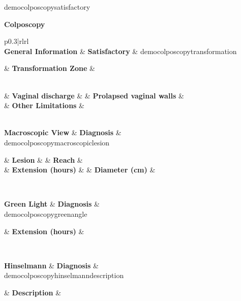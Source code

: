 \documentclass[6pt,letterpaper,spanish]{article}
\newcommand{\checkfor}[2]{%
  \ifcsname#1\endcsname%
    #2
  \else%
  \fi%
}
\begin{document}
\checkfor{democolposcopysatisfactory}{%
\begin{minipage}{\textwidth}
\noindent\makebox[\linewidth]{\rule{\textwidth}{0.1pt}}
\begin{center}
\begin{Large}
\textbf{Colposcopy}
\end{Large}
\end{center}
\vspace*{-0.5cm}
\noindent\makebox[\linewidth]{\rule{\textwidth}{0.1pt}}

\begin{tabular}{p{0.3\textwidth}|rlrl}
	\\
	\textbf{General Information}
	& \textbf{Satisfactory} & \democolposcopysatisfactory
	\checkfor{democolposcopytransformation}{
	& \textbf{Transformation Zone} & \democolposcopytransformation
	}\\
	& \textbf{Vaginal discharge} & \democolposcopylimitationsvaginaldischarge
	& \textbf{Prolapsed vaginal walls} & \democolposcopylimitationsvaginalwalls\\
	& \textbf{Other Limitations} & \multicolumn{3}{l}{\democolposcopylimitationsother}\\
	\\
	\checkfor{democolposcopymacroscopicdiagnosis}{
	\textbf{Macroscopic View}
	& \textbf{Diagnosis} & \multicolumn{3}{l}{\democolposcopymacroscopicdiagnosis}\\
	\checkfor{democolposcopymacroscopiclesion}{
		& \textbf{Lesion} & \democolposcopymacroscopiclesion
		& \textbf{Reach} & \democolposcopymacroscopicregion\\
		& \textbf{Extension (hours)} & \democolposcopymacroscopicangle
		& \textbf{Diameter (cm)} & \democolposcopymacroscopicdiameter\\
	}
	}
	\\
	\checkfor{democolposcopygreendiagnosis}{
	\textbf{Green Light}
	& \textbf{Diagnosis} & \multicolumn{3}{l}{\democolposcopygreendiagnosis}\\
		\checkfor{democolposcopygreenangle}{
			& \textbf{Extension (hours)} & \democolposcopygreenangle\\
		}
	}
	\\
	\checkfor{democolposcopyhinselmanndiagnosis}{
	\textbf{Hinselmann}
	& \textbf{Diagnosis} & \multicolumn{3}{l}{\democolposcopyhinselmanndiagnosis}\\
		\checkfor{democolposcopyhinselmanndescription}{
			& \textbf{Description} & 
				\multicolumn{3}{l}{\democolposcopyhinselmanndescription}\\
}}
\end{tabular}
\end{minipage}}
\end{document}
